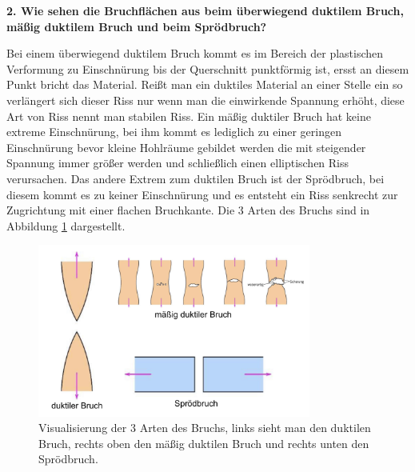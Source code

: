 \noindent\textbf{2. Wie sehen die Bruchflächen aus beim überwiegend duktilem Bruch, mäßig duktilem Bruch und beim Sprödbruch?}\\
\begin{addmargin}[25pt]{0pt}
Bei einem überwiegend duktilem Bruch kommt es im Bereich der plastischen Verformung zu Einschnürung bis der Querschnitt punktförmig ist, ersst an diesem Punkt bricht das Material. Reißt man ein duktiles Material an einer Stelle ein so verlängert sich dieser Riss nur wenn man die einwirkende Spannung erhöht, diese Art von Riss nennt man stabilen Riss. Ein mäßig duktiler Bruch hat keine extreme Einschnürung, bei ihm kommt es lediglich zu einer geringen Einschnürung bevor kleine Hohlräume gebildet werden die mit steigender Spannung immer größer werden und schließlich einen elliptischen Riss verursachen. Das andere Extrem zum duktilen Bruch ist der Sprödbruch, bei diesem kommt es zu keiner Einschnürung und es entsteht ein Riss senkrecht zur Zugrichtung mit einer flachen Bruchkante. Die 3 Arten des Bruchs sind in Abbildung \ref{fig:Brucharten} dargestellt.\\
\begin{figure}[h]
    \centering
    \includegraphics[width = 0.8\textwidth]{images/Materialwissenschaften/Brucharten.jpeg}
    \caption{Visualisierung der 3 Arten des Bruchs, links sieht man den duktilen Bruch, rechts oben den mäßig duktilen Bruch und rechts unten den Sprödbruch.}
    \label{fig:Brucharten}
\end{figure}
\end{addmargin}

